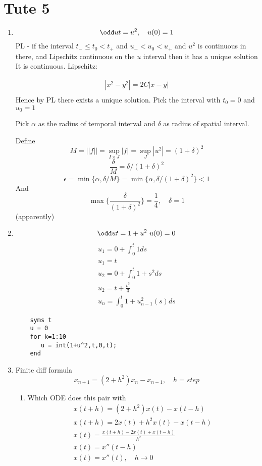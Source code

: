 \documentclass{X:/Documents/Coding/Latex/myassignment}
\begin{document}
\section{Tute 5}
\begin{enumerate}
    \item 
    \[\odd ut = u^2, \quad u(0)=1\]
    PL - if the interval $t_- \leq t_0 < t_+$ and $u_- < u_0 < u_+$ and $u^2$ is continuous in there, and Lipschitz continuous on the $u$ interval then it has a unique solution
    It is continuous.
    Lipschitz:

    \begin{align*}
        |x^2-y^2| = 2C|x-y|\\
    \end{align*}
    Hence by PL there exists a unique solution.
    Pick the interval with $t_0 = 0$ and $u_0 = 1$

    Pick $\alpha$ as the radius of temporal interval and $\delta$ as radius of spatial interval.

    Define 
    \[M = ||f|| = \sup_{I\times J} |f| = \sup_{J} |u^2| = (1+\delta)^2 \]
    \[\frac{\delta}{M} = \delta / (1+\delta)^2\]
    \[\epsilon = \min\{\alpha,\delta/M\} = \min\{\alpha, \delta/(1+\delta)^2\} < 1\]
    And
    \[\max\{\frac{\delta}{(1+\delta)^2}\} = \frac14, \quad \delta=1\]
    (apparently)


    \item 
    \[\odd ut = 1 + u^2 \ u(0) = 0\]
    \begin{align*}
        u_1 = 0 + \int_0^{t} 1 ds\\
        u_1 = t\\
        u_2 = 0 + \int_0^t 1 + s^2 ds\\
        u_2 = t + \frac{t^3}3\\
        u_n = \int_0^t 1+ u_{n-1}^2(s) ds
    \end{align*}

    \begin{verbatim}
    syms t
    u = 0 
    for k=1:10
       u = int(1+u^2,t,0,t);   
    end    
    \end{verbatim}
\item Finite diff formula
\[x_{n+1} = (2+h^2) x_n - x_{n-1} , \quad h=step\]
    \begin{enumerate}
        \item Which ODE does this pair with
        \begin{align*}
            x(t+h) = (2+h^2) x(t) - x(t-h)\\
            x(t+h) = 2x(t) + h^2x(t) - x(t-h)\\
            x(t) = \frac{x(t+h) - 2x(t) + x(t-h)}{h^2} \\
            x(t) = x''(t-h)\\
            x(t) = x''(t), \quad h\to 0 
        \end{align*}



\end{enumerate}
\end{enumerate}
\end{document}
